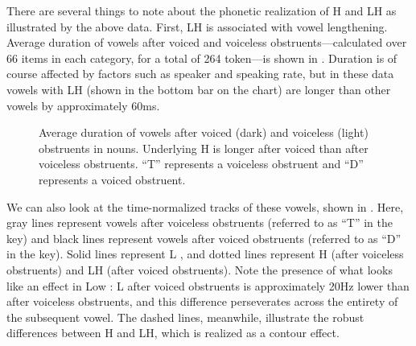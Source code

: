 \documentclass[output=paper,newtxmath,modfonts,nonflat,hidelinks]{langsci/langscibook}
\begin{document}
There are several things to note about the phonetic realization of H and LH as illustrated by the above data. First, LH  is associated with vowel lengthening. Average duration of vowels after voiced and voiceless obstruents—calculated over 66 items in each category, for a total of 264 token—is shown in . Duration is of course affected by factors such as speaker and speaking rate, but in these data vowels with LH  (shown in the bottom bar on the chart) are longer than other vowels by approximately 60ms.


\begin{figure} 
\caption{\label{fig:lotven:3} Average duration of vowels after voiced (dark) and voiceless (light) obstruents in nouns. Underlying H is longer after voiced than after voiceless obstruents. “T” represents a voiceless obstruent and “D” represents a voiced obstruent.}
\end{figure}


We can also look at the time-normalized  tracks of these vowels, shown in . Here, gray lines represent vowels after voiceless obstruents (referred to as “T” in the key) and black lines represent vowels after voiced obstruents (referred to as “D” in the key). Solid lines represent L , and dotted lines represent H (after voiceless obstruents) and LH (after voiced obstruents). Note the presence of what looks like an   effect in Low : L after voiced obstruents is approximately 20Hz lower than after voiceless obstruents, and this difference perseverates across the entirety of the subsequent vowel. The dashed lines, meanwhile, illustrate the robust  differences between H and LH, which is realized as a contour effect. 
\end{document}
